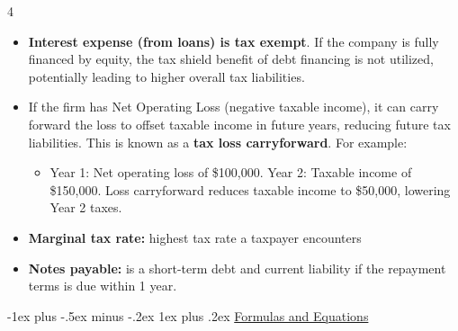 \documentclass[10pt, landscape]{article}
\makeatletter
\renewcommand{\subsubsection}{\@startsection{subsubsection}{3}{0mm}%
  {-1ex plus -.5ex minus -.2ex}%
  {1ex plus .2ex}%
{\normalfont\small\bfseries}}%
\makeatother
\begin{document}
\begin{multicols*}{4}
    \begin{itemize}
      \item \textbf{Interest expense (from loans) is tax exempt}. If the company is fully financed by equity, the tax shield benefit of debt financing is not utilized, potentially leading to higher overall tax liabilities.
      \item If the firm has Net Operating Loss (negative taxable income), it can carry forward the loss to offset taxable income in future years, reducing future tax liabilities. This is known as a \textbf{tax loss carryforward}. For example:
      \begin{itemize}
        \item Year 1: Net operating loss of \$100,000. Year 2: Taxable income of \$150,000. Loss carryforward reduces taxable income to \$50,000, lowering Year 2 taxes.
      \end{itemize}
      \item \textbf{Marginal tax rate:} highest tax rate a taxpayer encounters
      \item \textbf{Notes payable:} is a short-term debt and current liability if the repayment terms is due within 1 year.
    \end{itemize}

    \subsubsection{\underline{Formulas and Equations}}


\end{multicols*}
\end{document}
